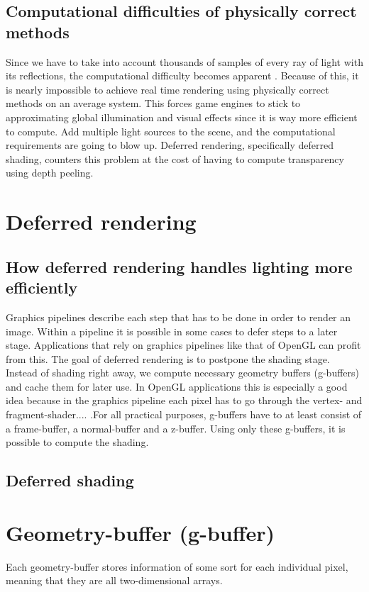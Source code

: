 \documentclass{ACGSeminar}
\begin{document}
	\subsection{Computational difficulties of physically correct methods}
	Since we have to take into account thousands of samples of every ray of light with its reflections, the computational difficulty becomes apparent \cite{DST}. Because of this, it is nearly impossible to achieve real time rendering using physically correct methods on an average system. This forces game engines to stick to approximating global illumination and visual effects since it is way more efficient to compute. Add multiple light sources to the scene, and the computational requirements are going to blow up. Deferred rendering, specifically deferred shading, counters this problem at the cost of having to compute transparency using depth peeling.

\section{Deferred rendering}
	\subsection{How deferred rendering handles lighting more efficiently}
		Graphics pipelines describe each step that has to be done in order to render an image. Within a pipeline it is possible in some cases to defer steps to a later stage. Applications that rely on graphics pipelines like that of OpenGL can profit from this.
		The goal of deferred rendering is to postpone the shading stage. %
		Instead of shading right away, we compute necessary geometry buffers (g-buffers) and cache 
		them for later use. In OpenGL applications this is especially a good idea because in the graphics pipeline each pixel has to go through the vertex- and fragment-shader.... .For all practical purposes, g-buffers have to at least consist of a frame-buffer, a normal-buffer and a z-buffer. Using only these g-buffers, it is possible to compute the shading.
	\subsection{Deferred shading}

\section{Geometry-buffer (g-buffer)}
	Each geometry-buffer stores information of some sort for each individual pixel, meaning that they are all two-dimensional arrays.
\end{document}
